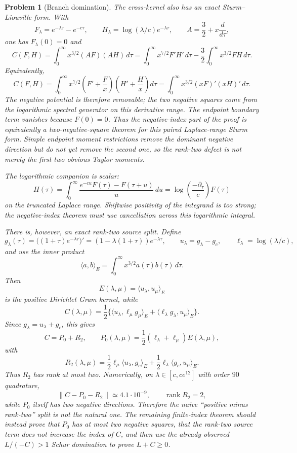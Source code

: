 \documentclass[11pt]{article}
\newtheorem{problem}[theorem]{Problem}
\begin{document}
\begin{problem}[Branch domination]
The cross-kernel also has an exact Sturm--Liouville form.  With
\[
  F_\lambda=e^{-\lambda\tau}-e^{-c\tau},\qquad
  H_\lambda=\log(\lambda/c)e^{-\lambda\tau},\qquad
  A=\frac32+x\frac{d}{d\tau},
\]
one has $F_\lambda(0)=0$ and
\[
  C(F,H)=\int_0^\infty x^{3/2}(AF)(AH)\,d\tau
  =
  \int_0^\infty x^{7/2}F'H'\,d\tau
  -\frac32\int_0^\infty x^{3/2}FH\,d\tau .
\]
Equivalently,
\[
  C(F,H)=
  \int_0^\infty x^{7/2}\left(F'+\frac{F}{x}\right)
  \left(H'+\frac{H}{x}\right)d\tau
  =
  \int_0^\infty x^{3/2}(xF)'(xH)'\,d\tau .
\]
The negative potential is therefore removable; the two negative squares come
from the logarithmic spectral generator on this derivative range.
The endpoint boundary term vanishes because $F(0)=0$.  Thus the negative-index
part of the proof is equivalently a two-negative-square theorem for this
paired Laplace-range Sturm form.  Simple endpoint moment restrictions remove
the dominant negative direction but do not yet remove the second one, so the
rank-two defect is not merely the first two obvious Taylor moments.

The logarithmic companion is scalar:
\[
  H(\tau)=\int_0^\infty
  \frac{e^{-cu}F(\tau)-F(\tau+u)}{u}\,du
  =
  \log\!\left(\frac{-\partial_\tau}{c}\right)F(\tau)
\]
on the truncated Laplace range.  Shiftwise positivity of the integrand is too
strong; the negative-index theorem must use cancellation across this logarithmic
integral.

There is, however, an exact rank-two source split.  Define
\[
  g_\lambda(\tau)=\bigl((1+\tau)e^{-\lambda\tau}\bigr)'
  =(1-\lambda(1+\tau))e^{-\lambda\tau},\qquad
  u_\lambda=g_\lambda-g_c,\qquad
  \ell_\lambda=\log(\lambda/c),
\]
and use the inner product
\[
  \langle a,b\rangle_E=\int_0^\infty x^{3/2}a(\tau)b(\tau)\,d\tau .
\]
Then
\[
  E(\lambda,\mu)=\langle u_\lambda,u_\mu\rangle_E
\]
is the positive Dirichlet Gram kernel, while
\[
  C(\lambda,\mu)=\frac12\{\langle u_\lambda,\ell_\mu g_\mu\rangle_E
  +\langle \ell_\lambda g_\lambda,u_\mu\rangle_E\}.
\]
Since $g_\lambda=u_\lambda+g_c$, this gives
\[
  C=P_0+R_2,
  \qquad
  P_0(\lambda,\mu)=\frac12(\ell_\lambda+\ell_\mu)E(\lambda,\mu),
\]
with
\[
  R_2(\lambda,\mu)
  =\frac12\ell_\mu\langle u_\lambda,g_c\rangle_E
  +\frac12\ell_\lambda\langle g_c,u_\mu\rangle_E .
\]
Thus $R_2$ has rank at most two.  Numerically, on
$\lambda\in[c,ce^{12}]$ with order $90$ quadrature,
\[
  \|C-P_0-R_2\|\simeq 4.1\cdot 10^{-9},\qquad
  \operatorname{rank}R_2=2,
\]
while $P_0$ itself has two negative directions.  Therefore the naive
``positive minus rank-two'' split is not the natural one.  The remaining
finite-index theorem should instead prove that $P_0$ has at most two negative
squares, that the rank-two source term does not increase the index of $C$, and
then use the already observed $L/(-C)>1$ Schur domination to prove $L+C\ge0$.


\end{problem}
\end{document}
